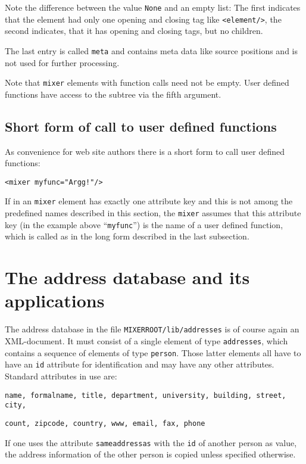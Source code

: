 \documentclass[a4paper,11pt]{article}
\newcommand{\MIXERROOT}{\texttt{MIXERROOT}}
\begin{document}
Note the difference between the value \verb!None!
and an empty list: The first indicates that the element had only
one opening and closing tag like \verb!<element/>!, the second
indicates, that it has opening and closing tags, but no children.

The last entry is called \verb!meta! and contains meta data like source
positions and is not used for further processing.

Note that \verb!mixer! elements with function calls need not be
empty. User defined functions have access to the subtree via the
fifth argument.

\subsection{Short form of call to user defined functions}

As convenience for web site authors there is a short form to call
user defined functions:

\begin{verbatim}
<mixer myfunc="Argg!"/>
\end{verbatim}

If in an \verb!mixer! element has exactly one attribute key and this is not 
among the predefined names described in this section, the \verb!mixer! assumes
that this attribute key (in the example above "`\verb!myfunc!"') is the name
of a user defined function, which is called as in the long form described
in the last subsection.

\section{The address database and its applications}

The address database in the file \MIXERROOT\verb!/lib/addresses! is of
course again an XML-document. It must consist of a single element
of type \verb!addresses!, which contains a sequence of elements
of type \verb!person!. Those latter elements all have to have an
\verb!id! attribute for identification and may have any other 
attributes. Standard attributes in use are:

\texttt{name, formalname, title, department, university, building, street, 
city,}

\texttt{count, zipcode, country, www, email, fax, phone}

If one uses the attribute \verb!sameaddressas! with the
\verb!id! of another person as value, the address information of the
other person is copied unless specified otherwise.
\end{document}
